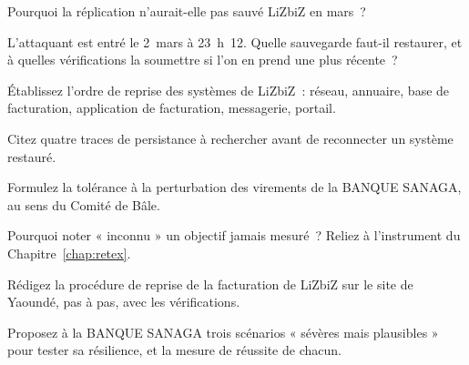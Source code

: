 \begin{boxexo}[title={\ding{45}\quad Exercice~19.3. Réplication \niveaubase}]
Pourquoi la réplication n'aurait-elle pas sauvé LiZbiZ en mars~?
\end{boxexo}

\begin{boxexo}[title={\ding{45}\quad Exercice~19.4. Le point de restauration \niveaumoyen}]
L'attaquant est entré le 2~mars à 23~h~12. Quelle sauvegarde faut-il
restaurer, et à quelles vérifications la soumettre si l'on en prend une
plus récente~?
\end{boxexo}

\begin{boxexo}[title={\ding{45}\quad Exercice~19.5. L'ordre \niveaumoyen}]
Établissez l'ordre de reprise des systèmes de LiZbiZ~: réseau, annuaire,
base de facturation, application de facturation, messagerie, portail.
\end{boxexo}

\begin{boxexo}[title={\ding{45}\quad Exercice~19.6. Persistance \niveaumoyen}]
Citez quatre traces de persistance à rechercher avant de reconnecter un
système restauré.
\end{boxexo}

\begin{boxexo}[title={\ding{45}\quad Exercice~19.7. Tolérance \niveaumoyen}]
Formulez la tolérance à la perturbation des virements de la BANQUE
SANAGA, au sens du Comité de Bâle.
\end{boxexo}

\begin{boxexo}[title={\ding{45}\quad Exercice~19.8. Inconnu \niveaumoyen}]
Pourquoi noter « inconnu » un objectif jamais mesuré~? Reliez à l'instrument
du Chapitre~\ref{chap:retex}.
\end{boxexo}

\begin{boxexo}[title={\ding{45}\quad Exercice~19.9. Un plan de reprise \niveauexpert}]
Rédigez la procédure de reprise de la facturation de LiZbiZ sur le site de
Yaoundé, pas à pas, avec les vérifications.
\end{boxexo}

\begin{boxexo}[title={\ding{45}\quad Exercice~19.10. Scénario sévère \niveauexpert}]
Proposez à la BANQUE SANAGA trois scénarios « sévères mais plausibles »
pour tester sa résilience, et la mesure de réussite de chacun.
\end{boxexo}

